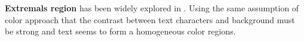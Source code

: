 \textbf{Extremals region} has been widely explored in \cite{Neumann12} \cite{xucheng.2013.pami} \cite{Shi_2013:_MSER}. Using the same assumption of color approach that the contrast between text characters and background must be strong and text seems to form a homogeneous color regions. 





